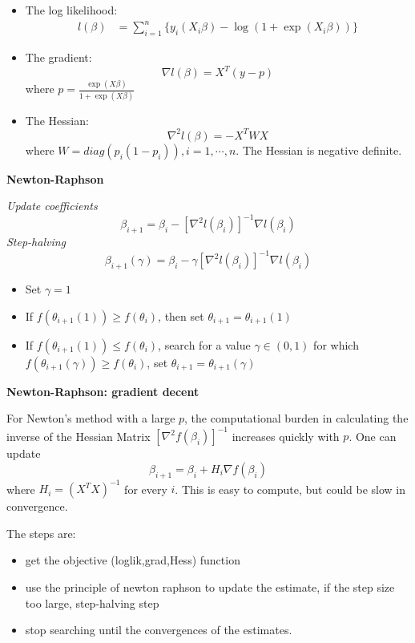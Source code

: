 \documentclass[ignorenonframetext,]{beamer}
\providecommand{\tightlist}{%
  \setlength{\itemsep}{0pt}\setlength{\parskip}{0pt}}
\begin{document}
\begin{frame}{}

\begin{itemize}
\item
  The log likelihood: \[
  \begin{aligned}
  l(\beta) 
  & = \sum_{i=1}^n \{y_i(X_{i}\beta)-\log(1+\exp(X_{i}\beta))\}
  \end{aligned}
  \]
\item
  The gradient: \[
  \nabla l(\beta) = X^T(y-p)
  \] where \(p=\frac{\exp(X\beta)}{1+\exp(X\beta)}\)
\item
  The Hessian: \[
  \nabla^2 l(\beta) = -X^T W X
  \] where \(W = diag(p_i(1-p_i)), i=1,\cdots,n\). The Hessian is
  negative definite.
\end{itemize}

\end{frame}

\begin{frame}{}

\textbf{Newton-Raphson}

\emph{Update coefficients}
\[\beta_{i+1} = \beta_{i} -[\nabla^2 l(\beta_{i})]^{-1}\nabla l(\beta_{i})\]
\emph{Step-halving} \[
\beta_{i+1}(\gamma) = \beta_{i} - \gamma[\nabla^2 l(\beta_{i})]^{-1}\nabla l(\beta_{i})
\]

\begin{itemize}
\tightlist
\item
  Set \(\gamma = 1\)
\item
  If \(f(\theta_{i+1}(1)) \geq f(\theta_{i})\), then set
  \(\theta_{i+1} = \theta_{i+1}(1)\)
\item
  If \(f(\theta_{i+1}(1)) \leq f(\theta_{i})\), search for a value
  \(\gamma \in (0,1)\) for which
  \(f(\theta_{i+1}(\gamma)) \geq f(\theta_{i})\), set
  \(\theta_{i+1} = \theta_{i+1}(\gamma)\)
\end{itemize}

\end{frame}

\begin{frame}{}

\textbf{Newton-Raphson: gradient decent}

For Newton's method with a large \(p\), the computational burden in
calculating the inverse of the Hessian Matrix
\([\nabla^2 f(\beta_{i})]^{-1}\) increases quickly with \(p\). One can
update \[
\beta_{i+1} = \beta_{i} + H_{i}\nabla f(\beta_{i})
\] where \(H_{i} = (X^TX)^{-1}\) for every \(i\). This is easy to
compute, but could be slow in convergence.

The steps are:

\begin{itemize}
\tightlist
\item
  get the objective (loglik,grad,Hess) function
\item
  use the principle of newton raphson to update the estimate, if the
  step size too large, step-halving step
\item
  stop searching until the convergences of the estimates.
\end{itemize}

\end{frame}
\end{document}
